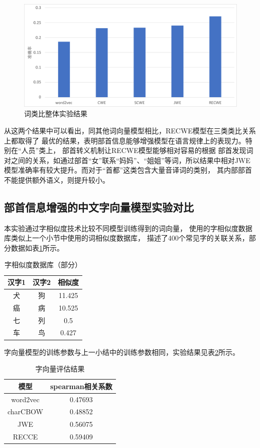 \begin{figure}[!h]
    \includegraphics[scale=0.5]{picture/word_analogy_result.pdf}
    \caption{词类比整体实验结果}
    \label{word_analogy_all_resutl}
\end{figure}

从这两个结果中可以看出，同其他词向量模型相比，RECWE模型在三类类比关系上都取得了
最优的结果，表明部首信息能够增强模型在语言规律上的表现力。特别在“人员”类上，
部首转义机制让RECWE模型能够相对容易的根据
部首发现词对之间的关系，如通过部首“女”联系“妈妈”、“姐姐”等词，所以结果中相对JWE模型准确率有较大提升。而对于“首都”这类包含大量音译词的类别，
其内部部首不能提供额外语义，则提升较小。

\subsection{部首信息增强的中文字向量模型实验对比}
本实验通过字相似度技术比较不同模型训练得到的词向量，
使用的字相似度数据库类似上一个小节中使用的词相似度数据库，
描述了400个常见字的关联关系，部分数据如表\ref{charsim_form}所示。
\begin{table}[h]
    \caption{字相似度数据库（部分）}
    \begin{tabular}{|c|c|c|}
        \hline
        汉字1 & 汉字2 & 相似度 \\
        \hline
        犬 & 狗 & 11.425 \\
        \hline
        癌 & 病 & 10.525 \\
        \hline
        七 & 列 & 0.5 \\
        \hline
        车 & 鸟 & 0.427 \\
        \hline
    \end{tabular}
    \label{charsim_form}
    \end{table}
字向量模型的训练参数与上一小结中的训练参数相同，实验结果见表\ref{char_vec_result}所示。
\begin{table}[!h]
    \caption{字向量评估结果}
    \begin{tabular}{|c|c|}
        \hline
        模型 &  spearman相关系数\\
        \hline
        word2vec & 0.47693 \\
        \hline
        charCBOW & 0.48852 \\
        \hline
        JWE & 0.56075 \\
        \hline
        RECCE & 0.59409 \\
        \hline
    \end{tabular}
    \label{char_vec_result}
    \end{table}

